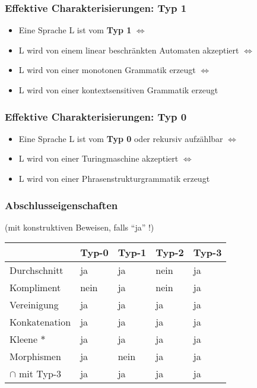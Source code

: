 \documentclass[12pt, a4paper]{article}
\begin{document}
		\subsubsection{Effektive Charakterisierungen: Typ 1}
		\begin{itemize}
			\item Eine Sprache L ist vom \textbf{Typ 1} $\Leftrightarrow$
			\item L wird von einem linear beschränkten Automaten akzeptiert $\Leftrightarrow$
			\item L wird von einer monotonen Grammatik erzeugt $\Leftrightarrow$
			\item L wird von einer kontextsensitiven Grammatik erzeugt
		\end{itemize}
		
		\subsubsection{Effektive Charakterisierungen: Typ 0}
		\begin{itemize}
			\item Eine Sprache L ist vom \textbf{Typ 0} oder rekursiv aufzählbar $\Leftrightarrow$
			\item L wird von einer Turingmaschine akzeptiert $\Leftrightarrow$
			\item L wird von einer Phrasenstrukturgrammatik erzeugt
		\end{itemize}
		
		\subsubsection{Abschlusseigenschaften} (mit konstruktiven Beweisen, falls “ja” !)\\
		\begin{center}
			\begin{tabular}{l||l|l|l|l}
									& Typ-0 & Typ-1 & Typ-2 & Typ-3  \\
				\hline
				\hline
				Durchschnitt		& ja 	& ja 	& nein 	& ja \\
				Kompliment			& nein 	& ja 	& nein 	& ja \\
				Vereinigung			& ja 	& ja 	& ja 	& ja \\
				Konkatenation		& ja 	& ja 	& ja 	& ja \\
				Kleene $\ast$		& ja 	& ja 	& ja 	& ja \\
				Morphismen			& ja 	& nein 	& ja 	& ja \\
				$\cap$ mit Typ-3 	& ja 	& ja 	& ja 	& ja \\
			\end{tabular}
		\end{center}
	
\end{document}
